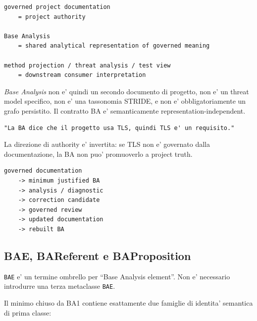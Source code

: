 \documentclass[11pt,a4paper]{article}
\newcommand{\BA}{\textit{Base Analysis}}
\newcommand{\code}[1]{\nolinkurl{#1}}
\begin{document}
\begin{lstlisting}
governed project documentation
    = project authority

Base Analysis
    = shared analytical representation of governed meaning

method projection / threat analysis / test view
    = downstream consumer interpretation
\end{lstlisting}

\BA{} non e' quindi un secondo documento di progetto, non e' un threat model specifico, non e' una tassonomia STRIDE, e non e' obbligatoriamente un grafo persistito. Il contratto BA e' semanticamente representation-independent.

\begin{badbox}
\begin{lstlisting}
"La BA dice che il progetto usa TLS, quindi TLS e' un requisito."
\end{lstlisting}
La direzione di authority e' invertita: se TLS non e' governato dalla documentazione, la BA non puo' promuoverlo a project truth.
\end{badbox}

\begin{goodbox}
\begin{lstlisting}
governed documentation
    -> minimum justified BA
    -> analysis / diagnostic
    -> correction candidate
    -> governed review
    -> updated documentation
    -> rebuilt BA
\end{lstlisting}
\end{goodbox}

\subsection{BAE, BAReferent e BAProposition}

\code{BAE} e' un termine ombrello per ``Base Analysis element''. Non e' necessario introdurre una terza metaclasse \code{BAE}.

Il minimo chiuso da BA1 contiene esattamente due famiglie di identita' semantica di prima classe:

\begin{center}
\end{center}
\end{document}

